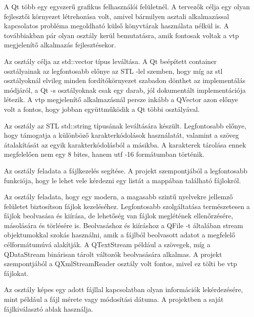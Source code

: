 A Qt több egy egyszerű grafikus felhasználói felületnél. 
A tervezők célja egy olyan fejlesztői környezet létrehozása volt, 
amivel bármilyen asztali alkalmazással kapcsolatos 
probléma megoldható külső könyvtárak használata nélkül is. 
A továbbiakban pár olyan osztály kerül bemutatásra, 
amik fontosak voltak a vtp megjelenítő alkalmazás fejlesztésekor.
\begin{description}[font=\normalfont\itshape\bfseries\space]
\item [QVector:] 
Az osztály célja az {\ttfamily std::vector} típus leváltása. 
A Qt beépített container osztályainak
az legfontosabb előnye az STL -lel szemben, 
hogy míg az stl osztályoknál 
elvileg minden fordítókörnyezet szabadon dönthet az implementálás módjáról, 
a Qt -s osztályoknak csak egy darab, 
jól dokumentált implementációja létezik. 
A vtp megjelenítő alkalmazásnál persze inkább 
a {\ttfamily QVector} azon előnye volt a fontos, 
hogy jobban együttműködik a Qt többi osztályával.
\item [QString:] 
Az osztály az STL {\ttfamily std::string} típusának leváltására készült. 
Legfontosabb előnye, 
hogy támogatja a különböző karakterkódolások használatát, 
valamint a szöveg átalakítását az egyik karakterkódolásból a másikba. 
A karakterek tárolása ennek megfelelően nem egy 8 bites, 
hanem utf -16 formátumban történik. 
\item [QDir:] 
Az osztály feladata a fájlkezelés segítése. 
A projekt szempontjából a legfontosabb funkciója, 
hogy le lehet vele kérdezni egy listát a mappában található fájlokról.
\item [QFile:] 
Az osztály feladata, 
hogy egy modern, a magasabb szintű nyelvekre 
jellemző felületet biztosítson fájlok kezeléséhez. 
Legfontosabb szolgáltatása természetesen a fájlok beolvasása és kiírása, 
de lehetőség van fájlok meglétének ellenőrzésére, 
másolására és törlésére is. 
Beolvasáshoz és kiíráshoz a {\ttfamily QFile} -t 
általában stream objektumokkal szokás használni, 
amik a fájlból beolvasott adatot a megfelelő célformátumúvá alakítják. 
A {\ttfamily QTextStream} például a szövegek, 
míg a {\ttfamily QDataStream} binárisan tárolt változók beolvasására alkalmas. 
A projekt szempontjából a {\ttfamily QXmlStreamReader} osztály volt fontos, 
mivel ez tölti be vtp fájlokat. 
\item [QFileInfo:]
Az osztály képes egy adott fájllal kapcsolatban 
olyan információk lekérdezésére, 
mint például a fájl mérete vagy módosítási dátuma. 
A projektben a saját fájlkiválasztó ablak használja.
\end{description}

